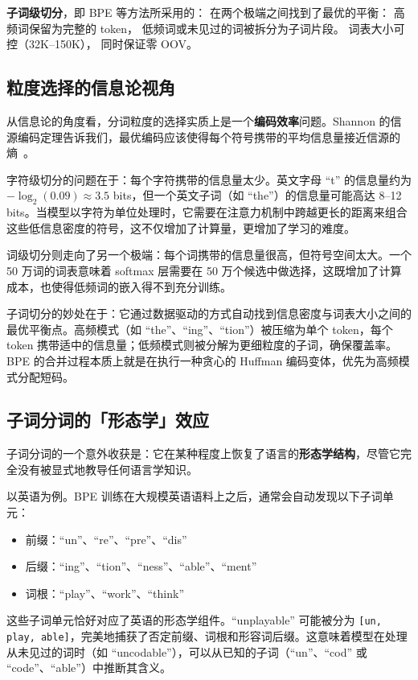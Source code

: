 \textbf{子词级切分}，即 BPE 等方法所采用的：
在两个极端之间找到了最优的平衡：
高频词保留为完整的 token，
低频词或未见过的词被拆分为子词片段。
词表大小可控（32K--150K），
同时保证零 OOV。

\subsection{粒度选择的信息论视角}

从信息论的角度看，分词粒度的选择实质上是一个\textbf{编码效率}问题。Shannon 的信源编码定理告诉我们，最优编码应该使得每个符号携带的平均信息量接近信源的熵~\cite{shannon1948}。

字符级切分的问题在于：每个字符携带的信息量太少。英文字母 “t” 的信息量约为 $-\log_2(0.09) \approx 3.5$ bits，但一个英文子词（如 “the”）的信息量可能高达 8--12 bits。当模型以字符为单位处理时，它需要在注意力机制中跨越更长的距离来组合这些低信息密度的符号，这不仅增加了计算量，更增加了学习的难度。

词级切分则走向了另一个极端：每个词携带的信息量很高，但符号空间太大。一个 50 万词的词表意味着 softmax 层需要在 50 万个候选中做选择，这既增加了计算成本，也使得低频词的嵌入得不到充分训练。

子词切分的妙处在于：它通过数据驱动的方式自动找到信息密度与词表大小之间的最优平衡点。高频模式（如 “the”、“ing”、“tion”）被压缩为单个 token，每个 token 携带适中的信息量；低频模式则被分解为更细粒度的子词，确保覆盖率。BPE 的合并过程本质上就是在执行一种贪心的 Huffman 编码变体，优先为高频模式分配短码。

\subsection{子词分词的「形态学」效应}

子词分词的一个意外收获是：它在某种程度上恢复了语言的\textbf{形态学结构}，尽管它完全没有被显式地教导任何语言学知识。

以英语为例。BPE 训练在大规模英语语料上之后，通常会自动发现以下子词单元：
\begin{itemize}[noitemsep]
  \item 前缀：“un”、“re”、“pre”、“dis”
  \item 后缀：“ing”、“tion”、“ness”、“able”、“ment”
  \item 词根：“play”、“work”、“think”
\end{itemize}

这些子词单元恰好对应了英语的形态学组件。“unplayable” 可能被分为 \texttt{[un, play, able]}，完美地捕获了否定前缀、词根和形容词后缀。这意味着模型在处理从未见过的词时（如 “uncodable”），可以从已知的子词（“un”、“cod” 或 “code”、“able”）中推断其含义。

